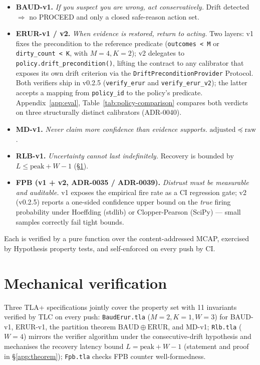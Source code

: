 \documentclass[11pt,a4paper]{article}
\begin{document}
\begin{itemize}[noitemsep,topsep=2pt]
  \item \textbf{BAUD-v1.} \emph{If you suspect you are wrong, act
        conservatively.} Drift detected $\Rightarrow$ no PROCEED
        and only a closed safe-reason action set.
  \item \textbf{ERUR-v1 / v2.} \emph{When evidence is restored,
        return to acting.} Two layers: v1 fixes the precondition
        to the reference predicate (\texttt{outcomes < M} or
        \texttt{dirty\_count < K}, with $M=4, K=2$); v2 delegates
        to \texttt{policy.drift\_precondition()}, lifting the
        contract to any calibrator that exposes its own drift
        criterion via the \texttt{DriftPreconditionProvider}
        Protocol. Both verifiers ship in v0.2.5
        (\texttt{verify\_erur} and \texttt{verify\_erur\_v2}); the
        latter accepts a mapping from \texttt{policy\_id} to the
        policy's predicate. Appendix~\ref{app:eval},
        Table~\ref{tab:policy-comparison} compares both verdicts
        on three structurally distinct calibrators (ADR-0040).
  \item \textbf{MD-v1.} \emph{Never claim more confidence than
        evidence supports.} $\mathrm{adjusted} \preceq
        \mathrm{raw}$.
  \item \textbf{RLB-v1.} \emph{Uncertainty cannot last
        indefinitely.} Recovery is bounded by
        $L \le \mathrm{peak} + W - 1$ (\S\ref{sec:mechanical}).
  \item \textbf{FPB (v1 + v2, ADR-0035 / ADR-0039).}
        \emph{Distrust must be measurable and auditable.} v1
        exposes the empirical fire rate as a CI regression gate;
        v2 (v0.2.5) reports a one-sided confidence upper bound
        on the \emph{true} firing probability under Hoeffding
        (stdlib) or Clopper-Pearson (SciPy) --- small samples
        correctly fail tight bounds.
\end{itemize}

Each is verified by a pure function over the content-addressed
MCAP, exercised by Hypothesis property tests, and self-enforced on
every push by CI.

\section{Mechanical verification}
\label{sec:mechanical}

Three TLA+ specifications jointly cover the property set with 11
invariants verified by TLC on every push:
\texttt{BaudErur.tla} ($M{=}2, K{=}1, W{=}3$) for BAUD-v1, ERUR-v1,
the partition theorem $\mathrm{BAUD} \oplus \mathrm{ERUR}$, and
MD-v1; \texttt{Rlb.tla} ($W{=}4$) mirrors the verifier algorithm
under the consecutive-drift hypothesis and mechanises the recovery
latency bound $L = \mathrm{peak} + W - 1$ (statement and proof in
\S\ref{app:theorem}); \texttt{Fpb.tla} checks FPB counter
well-formedness.
\end{document}
